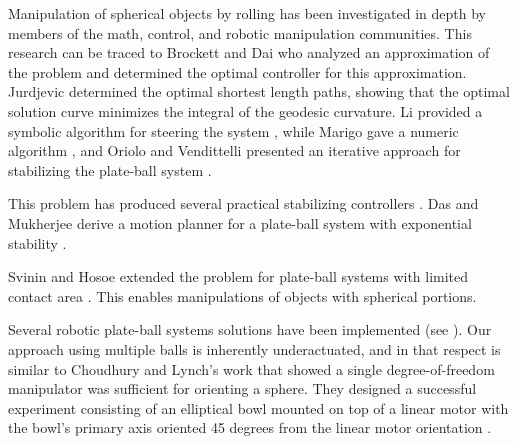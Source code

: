 \documentclass[letter paper, 10pt, conference]{ieeeconf}
\begin{document}
Manipulation of spherical objects by rolling has been investigated in depth by members of the math, control, and robotic manipulation communities. %
 This research can be traced to Brockett and Dai who analyzed an approximation of the problem and determined the optimal controller for this approximation\cite{Brockett1993}.  
Jurdjevic determined the optimal shortest length paths, showing that the optimal solution curve minimizes the integral of the geodesic curvature\cite{Jurdjevic1993}. %
  Li provided a symbolic algorithm for steering the system \cite{Li1990}, while Marigo gave a numeric algorithm \cite{Marigo2000},
and Oriolo and Vendittelli presented an iterative approach for stabilizing the plate-ball system \cite{Oriolo2005}.  %

This problem has produced several practical stabilizing controllers \cite{Date 2004, Casagrande2009}. %
Das and Mukherjee derive a motion planner for a plate-ball system with exponential stability \cite{Das2004}.

Svinin and Hosoe extended the problem for plate-ball systems with limited contact area \cite{Svinin2008a}.  This enables manipulations of objects with spherical portions.  %

Several robotic plate-ball systems solutions have been implemented (see \cite{Marigo2000, Bicchi1995}).
Our approach using multiple balls is inherently underactuated, and in that respect is similar to Choudhury and Lynch's work that showed a single degree-of-freedom manipulator was sufficient for orienting a sphere.  They  designed a successful experiment consisting of an elliptical bowl mounted on top of a linear motor with the bowl's primary axis oriented 45 degrees from the linear motor orientation \cite{Choudhury2001}.


   
\end{document}
